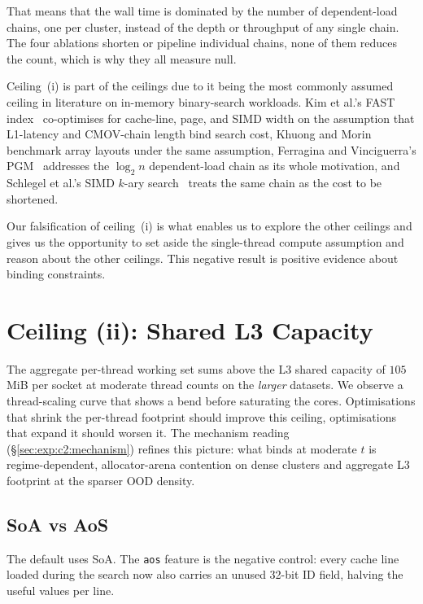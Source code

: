 That means that the wall time is dominated by the number of dependent-load chains, one per cluster, instead of the depth or throughput of any single chain. The four ablations shorten or pipeline individual chains, none of them reduces the count, which is why they all measure null.

Ceiling~(i) is part of the ceilings due to it being the most commonly assumed ceiling in literature on in-memory binary-search workloads. Kim et al.'s FAST index~\cite{kim_2010} co-optimises for cache-line, page, and SIMD width on the assumption that L1-latency and CMOV-chain length bind search cost, Khuong and Morin~\cite{khuong_morin_2017} benchmark array layouts under the same assumption, Ferragina and Vinciguerra's PGM~\cite{ferragina_2020} addresses the $\log_2 n$ dependent-load chain as its whole motivation, and Schlegel et al.'s SIMD $k$-ary search~\cite{schlegel_2009} treats the same chain as the cost to be shortened.

Our falsification of ceiling~(i) is what enables us to explore the other ceilings and gives us the opportunity to set aside the single-thread compute assumption and reason about the other ceilings. This negative result is positive evidence about binding constraints.

\section{Ceiling (ii): Shared L3 Capacity\label{sec:exp:c2}}

The aggregate per-thread working set sums above the L3 shared capacity of $105$\,MiB per socket at moderate thread counts on the \emph{larger} datasets. We observe a thread-scaling curve that shows a bend before saturating the cores. Optimisations that shrink the per-thread footprint should improve this ceiling, optimisations that expand it should worsen it. The mechanism reading (§\ref{sec:exp:c2:mechanism}) refines this picture: what binds at moderate $t$ is regime-dependent, allocator-arena contention on dense clusters and aggregate L3 footprint at the sparser OOD density.

\subsection{SoA vs AoS\label{sec:exp:c2:soa}}

The default uses SoA. The \texttt{aos} feature is the negative control: every cache line loaded during the search now also carries an unused 32-bit ID field, halving the useful values per line.

